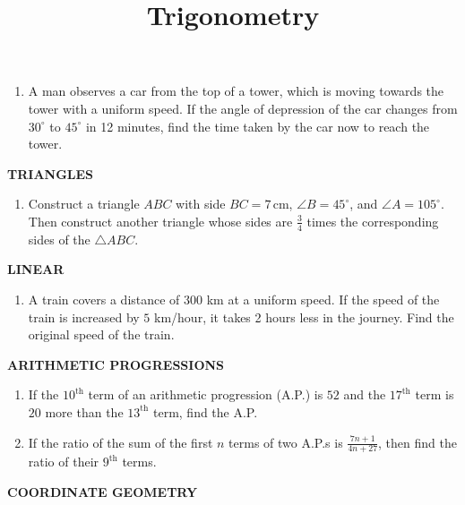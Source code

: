 \documentclass{article}
\title{Trigonometry}
\date{}
\begin{document}
\maketitle

\begin{enumerate}
    \item A man observes a car from the top of a tower, which is moving towards the tower with a uniform speed. If the angle of depression of the car changes from $30^\circ$ to $45^\circ$ in 12 minutes, find the time taken by the car now to reach the tower.
\end{enumerate}

\begin{center}
\textbf{TRIANGLES}
\end{center}

\begin{enumerate}
    \item Construct a triangle $ABC$ with side $BC = 7\, \text{cm}$, $\angle B = 45^\circ$, and $\angle A = 105^\circ$. Then construct another triangle whose sides are $\frac{3}{4}$ times the corresponding sides of the $\triangle ABC$.
\end{enumerate}

\begin{center}
\textbf{LINEAR}
\end{center}

\begin{enumerate}
    \item A train covers a distance of $300$ km at a uniform speed. If the speed of the train is increased by $5$ km/hour, it takes 2 hours less in the journey. Find the original speed of the train.
\end{enumerate}

\begin{center}
\textbf{ARITHMETIC PROGRESSIONS}
\end{center}

\begin{enumerate}
    \item If the $10^\text{th}$ term of an arithmetic progression (A.P.) is $52$ and the $17^\text{th}$ term is $20$ more than the $13^\text{th}$ term, find the A.P.
    \item If the ratio of the sum of the first $n$ terms of two A.P.s is $\frac{7n + 1}{4n + 27}$, then find the ratio of their $9^\text{th}$ terms.
\end{enumerate}

\begin{center}
\textbf{COORDINATE GEOMETRY}
\end{center}
\end{document}
